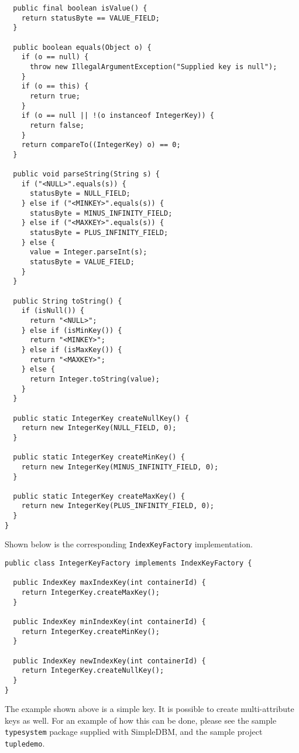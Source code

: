 \documentclass[a4paper,draft,oneside]{book}
\begin{document}
\begin{verbatim}
  public final boolean isValue() {
    return statusByte == VALUE_FIELD;
  }

  public boolean equals(Object o) {
    if (o == null) {
      throw new IllegalArgumentException("Supplied key is null");
    }
    if (o == this) {
      return true;
    }
    if (o == null || !(o instanceof IntegerKey)) {
      return false;
    }
    return compareTo((IntegerKey) o) == 0;
  }

  public void parseString(String s) {
    if ("<NULL>".equals(s)) {
      statusByte = NULL_FIELD;
    } else if ("<MINKEY>".equals(s)) {
      statusByte = MINUS_INFINITY_FIELD;
    } else if ("<MAXKEY>".equals(s)) {
      statusByte = PLUS_INFINITY_FIELD;
    } else {
      value = Integer.parseInt(s);
      statusByte = VALUE_FIELD;
    }
  }

  public String toString() {
    if (isNull()) {
      return "<NULL>";
    } else if (isMinKey()) {
      return "<MINKEY>";
    } else if (isMaxKey()) {
      return "<MAXKEY>";
    } else {
      return Integer.toString(value);
    }
  }

  public static IntegerKey createNullKey() {
    return new IntegerKey(NULL_FIELD, 0);
  }

  public static IntegerKey createMinKey() {
    return new IntegerKey(MINUS_INFINITY_FIELD, 0);
  }

  public static IntegerKey createMaxKey() {
    return new IntegerKey(PLUS_INFINITY_FIELD, 0);
  }
}
\end{verbatim}

Shown below is the corresponding \verb|IndexKeyFactory| implementation.

\begin{verbatim}
public class IntegerKeyFactory implements IndexKeyFactory {

  public IndexKey maxIndexKey(int containerId) {
    return IntegerKey.createMaxKey();
  }

  public IndexKey minIndexKey(int containerId) {
    return IntegerKey.createMinKey();
  }

  public IndexKey newIndexKey(int containerId) {
    return IntegerKey.createNullKey();
  }
}
\end{verbatim}

The example shown above is a simple key. It is possible to create 
multi-attribute keys as well. For an example of how this can be done,
please see the sample \verb|typesystem| package supplied with SimpleDBM,
and the sample project \verb|tupledemo|.
\end{document}
